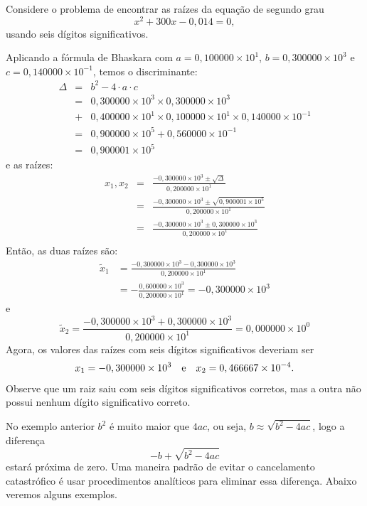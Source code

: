 \begin{ex} Considere o problema de encontrar as raízes da equação de segundo grau
  \begin{equation*}
    x^2+300x-0,014=0,
  \end{equation*}
usando seis dígitos significativos.

Aplicando a fórmula de Bhaskara com $a=0,100000\times 10^1$, $b=0,300000\times 10^3$ e $c=0,140000\times 10^{-1}$, temos o discriminante:
\begin{eqnarray*}
  \Delta &=& b^2 - 4\cdot a\cdot c\\
  &=&0,300000\times 10^3\times 0,300000\times 10^3 \\
  &+& 0,400000\times 10^1\times 0,100000\times 10^1\times 0,140000\times 10^{-1}\\
  &=&0,900000\times 10^5 +0,560000\times  10^{-1}\\
  &=&0,900001\times 10^5
\end{eqnarray*}
e as raízes:
\begin{eqnarray*}
x_1,x_2 &=& \frac{-0,300000\times 10^3\pm \sqrt{\Delta}}{0,200000\times 10^1} \\
&=& \frac{-0,300000\times 10^3\pm \sqrt{0,900001\times 10^5}}{0,200000\times 10^1} \\
&=& \frac{-0,300000\times 10^3\pm 0,300000\times 10^3}{0,200000\times 10^1}\\
\end{eqnarray*}
Então, as duas raízes são:
\begin{align*}
  \tilde{x}_1 &= \frac{-0,300000\times 10^3- 0,300000\times 10^3}{0,200000\times 10^1}\\
  &=-\frac{0,600000\times 10^3}{0,200000\times 10^1}=-0,300000\times 10^3
\end{align*}
e
\begin{equation*}
\tilde{x}_2=\frac{-0,300000\times 10^3+ 0,300000\times 10^3}{0,200000\times 10^1}=0,000000\times 10^{0} 
\end{equation*}
Agora, os valores das raízes com seis dígitos significativos deveriam ser
\begin{equation*}
  x_1=-0,300000\times 10^{3}\quad\hbox{e}\quad x_2=0,466667\times 10^{-4}.  
\end{equation*}
Observe que um raiz saiu com seis dígitos significativos corretos, mas a outra não possui nenhum dígito significativo correto.
\end{ex}

\begin{obs}
No exemplo anterior $b^2$ é muito maior que $4ac$, ou seja, $b\approx \sqrt{b^2-4ac}$, logo a diferença
\begin{equation*}
  -b+\sqrt{b^2-4ac}
\end{equation*}
estará próxima de zero. Uma maneira padrão de evitar o cancelamento catastrófico é usar procedimentos analíticos para eliminar essa diferença. Abaixo veremos alguns exemplos.  
\end{obs}


